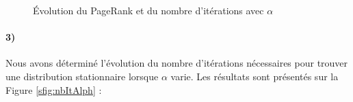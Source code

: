 \documentclass[a4paper,titlepage]{report}
\begin{document}
\begin{figure}[h]
	\center
	\caption{Évolution du PageRank et du nombre d'itérations avec $\alpha$}
\end{figure}
\paragraph{3)}
Nous avons déterminé l'évolution du nombre d'itérations nécessaires pour trouver une distribution stationnaire lorsque $\alpha$ varie. Les résultats sont présentés sur la Figure \ref{sfig:nbItAlph} :  
\end{document}
